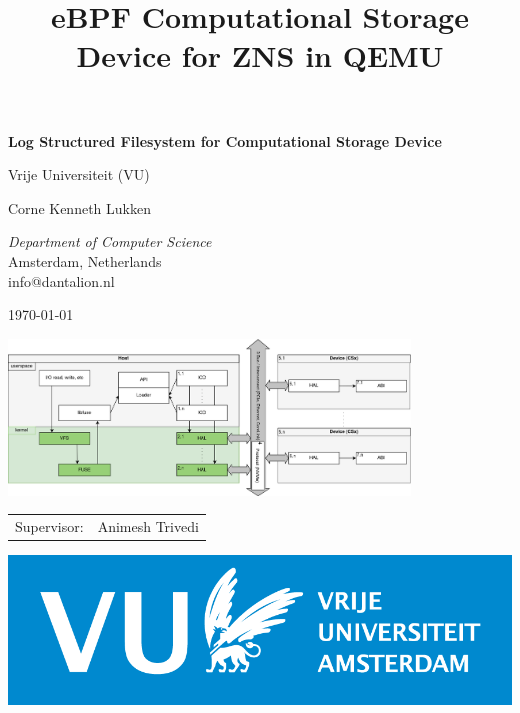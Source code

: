 \documentclass[conference]{IEEEtran}
\title{eBPF Computational Storage Device for ZNS in QEMU%
}
\begin{document}
\begin{titlepage}
\begingroup
\centering
{\LARGE\bfseries Log Structured Filesystem for Computational Storage Device}

\vspace{1cm}

{\Large Vrije Universiteit (VU)}

\vspace{0.5cm}

{Corne Kenneth Lukken}

{\textit{Department of Computer Science} \\
Amsterdam, Netherlands \\
info@dantalion.nl}

\vspace{0.5cm}

\today

\vspace{4.0cm}

\includegraphics[width=0.8\textwidth]{resources/images/loader-pfs-arch-2.drawio.png}

\vfill
\endgroup
\begin{minipage}{0.4\textwidth}
	\begin{tabular}{ll}
		\Large Supervisor: & \Large Animesh Trivedi \\
	\end{tabular}
\end{minipage} \hfill
\begin{minipage}{0.3\textwidth}
	\begin{flushright}
	\includegraphics[width=\textwidth]{resources/images/vu-logo.png}
\end{flushright}
\end{minipage}
\end{titlepage}
\end{document}
